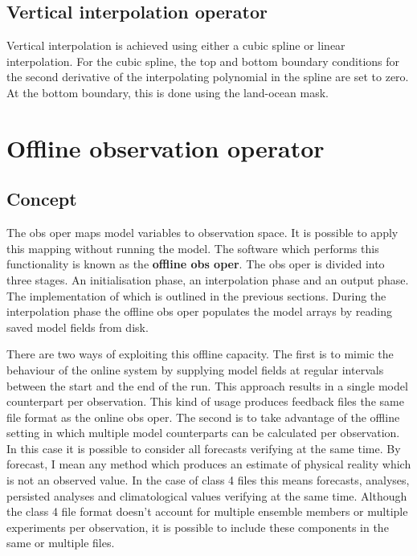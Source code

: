 \subsection{Vertical interpolation operator}

Vertical interpolation is achieved using either a cubic spline or
linear interpolation. For the cubic spline, the top and
bottom boundary conditions for the second derivative of the 
interpolating polynomial in the spline are set to zero.
At the bottom boundary, this is done using the land-ocean mask.

\newpage



\section{Offline observation operator}
\label{OBS_ooo}

\subsection{Concept}

The obs oper maps model variables to observation space. It is possible to apply this mapping
without running the model. The software which performs this functionality is known as the
\textbf{offline obs oper}. The obs oper is divided into three stages. An initialisation phase,
an interpolation phase and an output phase. The implementation of which is outlined in the
previous sections. During the interpolation phase the offline obs oper populates the model
arrays by reading saved model fields from disk.

There are two ways of exploiting this offline capacity. The first is to mimic the behaviour of
the online system by supplying model fields at regular intervals between the start and the end
of the run. This approach results in a single model counterpart per observation. This kind of
usage produces feedback files the same file format as the online obs oper. 
The second is to take advantage of the offline setting in which multiple model counterparts can
be calculated per observation. In this case it is possible to consider all forecasts verifying
at the same time. By forecast, I mean any method which produces an estimate of physical reality
which is not an observed value. In the case of class 4 files this means forecasts, analyses, persisted
analyses and climatological values verifying at the same time. Although the class 4 file format
doesn't account for multiple ensemble members or multiple experiments per observation, it is possible
to include these components in the same or multiple files.

